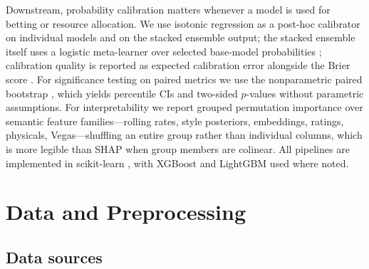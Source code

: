 \documentclass[12pt,oneside]{report}
\begin{document}
Downstream, probability calibration matters whenever a model is used
for betting or resource allocation.  We use isotonic regression
\citep{zadrozny2002transforming,niculescu2005predicting} as a
post-hoc calibrator on individual models and on the stacked ensemble output; the stacked ensemble itself uses a logistic meta-learner over selected base-model probabilities \citep{wolpert1992stacked,breiman1996stacked};
calibration quality is reported as expected calibration error
\citep{guo2017calibration} alongside the Brier score
\citep{brier1950verification}.  For significance testing on paired
metrics we use the nonparametric paired bootstrap
\citep{efron1979bootstrap}, which yields percentile CIs and two-sided
$p$-values without parametric assumptions.  For interpretability we
report grouped permutation importance
\citep{breiman2001random} over semantic
feature families---rolling rates, style posteriors, embeddings,
ratings, physicals, Vegas---shuffling an entire group rather than
individual columns, which is more legible than SHAP when group
members are colinear.  All pipelines are implemented in scikit-learn
\citep{scikitlearn2011}, with XGBoost \citep{chen2016xgboost} and
LightGBM \citep{ke2017lightgbm} used where noted.

\chapter{Data and Preprocessing}\label{ch:data}

\section{Data sources}
\end{document}
